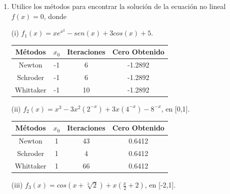 \documentclass{udpreport}
\begin{document}
\begin{enumerate}
\begin{itemize}
\end{itemize}
	\begin{enumerate}
	
		\item Utilice los métodos para encontrar la solución de la ecuación no lineal $f(x)=0$, donde
		
		(i) $f_{1}(x)=xe^{x^2}-sen(x)+3cos(x)+5$.
		
		\begin{table}[H]
			\centering
			\begin{tabular}{|c|c|c|c|}
				\hline
				Métodos & $x_{0}$ & Iteraciones & Cero Obtenido \\
				\hline
				Newton & -1 & 6 & -1.2892 \\
				\hline
				Schroder & -1 & 6 & -1.2892 \\
				\hline
				Whittaker & -1 & 10 & -1.2892 \\
				\hline				
			\end{tabular}
			\end{table}	
		
		
		
		(ii) $f_{2}(x)=x^3-3x^2(2^{-x})+3x(4^{-x})-8^{-x}$, en [0,1].
		
			\begin{table}[H]
			\centering
			\begin{tabular}{|c|c|c|c|}
				\hline
				Métodos & $x_{0}$ & Iteraciones & Cero Obtenido \\
				\hline
				Newton & 1 & 43 & 0.6412 \\
				\hline
				Schroder & 1 & 4 & 0.6412\\
				\hline
				Whittaker & 1 & 66 & 0.6412\\
				\hline				
			\end{tabular}
			\end{table}	
			
		(iii) $f_{3}(x)=cos(x+\sqrt[2]{2})+x(\frac{x}{2}+2)$, en [-2,1].	
		

\end{enumerate}
\end{enumerate}
\end{document}
